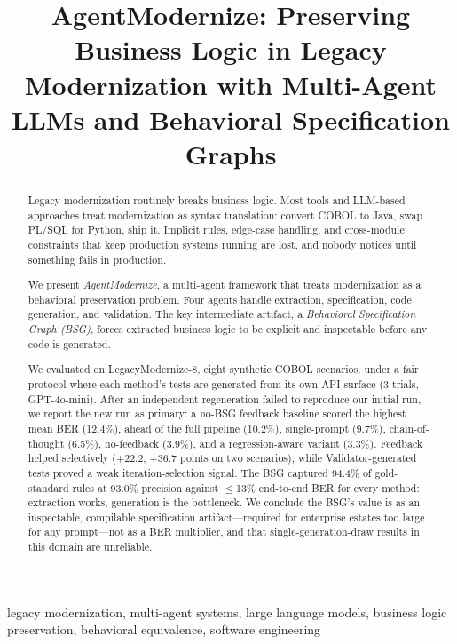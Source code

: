 \documentclass[conference]{IEEEtran}
\begin{document}
\title{AgentModernize: Preserving Business Logic in Legacy Modernization with Multi-Agent LLMs and Behavioral Specification Graphs}

\author{
}

\maketitle

\begin{abstract}
Legacy modernization routinely breaks business logic. Most tools and LLM-based approaches treat modernization as syntax translation: convert COBOL to Java, swap PL/SQL for Python, ship it. Implicit rules, edge-case handling, and cross-module constraints that keep production systems running are lost, and nobody notices until something fails in production.

We present \textit{AgentModernize}, a multi-agent framework that treats modernization as a behavioral preservation problem. Four agents handle extraction, specification, code generation, and validation. The key intermediate artifact, a \textit{Behavioral Specification Graph (BSG)}, forces extracted business logic to be explicit and inspectable before any code is generated.

We evaluated on LegacyModernize-8, eight synthetic COBOL scenarios, under a fair protocol where each method's tests are generated from its own API surface (3 trials, GPT-4o-mini). After an independent regeneration failed to reproduce our initial run, we report the new run as primary: a no-BSG feedback baseline scored the highest mean BER (12.4\%), ahead of the full pipeline (10.2\%), single-prompt (9.7\%), chain-of-thought (6.5\%), no-feedback (3.9\%), and a regression-aware variant (3.3\%). Feedback helped selectively (+22.2, +36.7 points on two scenarios), while Validator-generated tests proved a weak iteration-selection signal. The BSG captured 94.4\% of gold-standard rules at 93.0\% precision against $\leq$13\% end-to-end BER for every method: extraction works, generation is the bottleneck. We conclude the BSG's value is as an inspectable, compilable specification artifact---required for enterprise estates too large for any prompt---not as a BER multiplier, and that single-generation-draw results in this domain are unreliable.
\end{abstract}

\begin{IEEEkeywords}
legacy modernization, multi-agent systems, large language models, business logic preservation, behavioral equivalence, software engineering
\end{IEEEkeywords}
\end{document}
